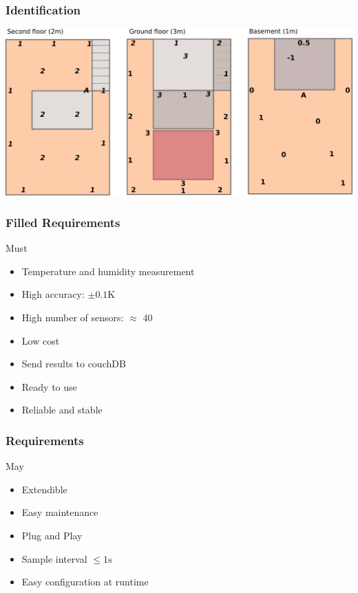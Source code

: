 \documentclass[t]{beamer}
\begin{document}
\begin{frame}[c]
    \frametitle{Identification}
  \begin{center}
  	\includegraphics[width=0.9\linewidth]{img/installPlan.pdf}\\
  \vspace{0.5cm}
  \end{center}
\end{frame}
\begin{frame}[c]
    \frametitle{Filled Requirements}
		\begin{alertblock}{Must}
      \textcolor{blue!30!green}{
			\begin{itemize}
        \item Temperature and humidity measurement
        \item High accuracy: $\pm0.1\mathrm{K}$
        \item High number of sensors: $\approx$ 40
        \item Low cost
        \item Send results to couchDB
        \item Ready to use
        \item Reliable and stable
			\end{itemize}
    }
		\end{alertblock}
\end{frame}
\begin{frame}[c]
    \frametitle{Requirements}
		\begin{exampleblock}{May}
			\begin{itemize}
				\item Extendible
        \item Easy maintenance
				\item Plug and Play
				\item Sample interval $\le 1\mathrm{s}$
				\item Easy configuration at runtime
			\end{itemize}
		\end{exampleblock}
\end{frame}
\end{document}
